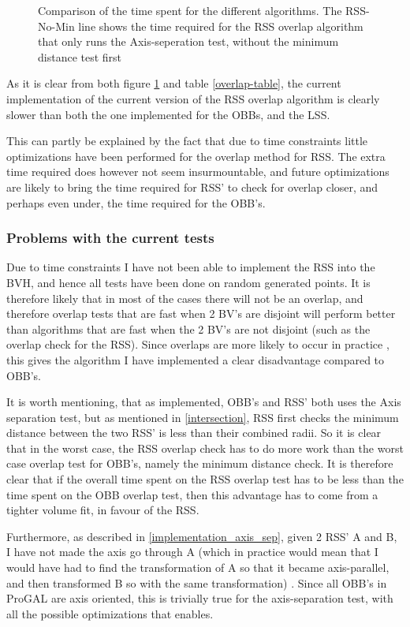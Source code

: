 \begin{figure}
\caption{\label{overlap-OBB_RSS_RSS-No-Min_LSS}Comparison of the time spent for the different algorithms. The RSS-No-Min line shows the time required for the RSS overlap algorithm that only runs the Axis-seperation test, without the minimum distance test first}
\end{figure}

As it is clear from both figure \ref{overlap-OBB_RSS_RSS-No-Min_LSS} and table \ref{overlap-table}, the current implementation of the current version of the RSS overlap algorithm is clearly slower than both the one implemented for the OBBs, and the LSS. 

This can partly be explained by the fact that due to time constraints little optimizations have been performed for the overlap method for RSS. The extra time required does however not seem insurmountable, and future optimizations are likely to bring the time required for RSS' to check for overlap closer, and perhaps even under, the time required for the OBB's.

\subsubsection{Problems with the current tests}
\label{test_problems}
Due to time constraints I have not been able to implement the RSS into the BVH, and hence all tests have been done on random generated points. It is therefore likely that in most of the cases there will not be an overlap, and therefore overlap tests that are fast when 2 BV's are disjoint will perform better than algorithms that are fast when the 2 BV's are not disjoint (such as the overlap check for the RSS). Since overlaps are more likely to occur in practice , this gives the algorithm I have implemented a clear disadvantage compared to OBB's.

It is worth mentioning, that as implemented, OBB's and RSS' both uses the Axis separation test, but as mentioned in \ref{intersection}, RSS first checks the minimum distance between the two RSS' is less than their combined radii. So it is clear that in the worst case, the RSS overlap check has to do more work than the worst case overlap test for OBB's, namely the minimum distance check. It is therefore clear that if the overall time spent on the RSS overlap test has to be less than the time spent on the OBB overlap test, then this advantage has to come from a tighter volume fit, in favour of the RSS. 

Furthermore, as described in \ref{implementation_axis_sep}, given 2 RSS' A and B, I have not made the axis go through A (which in practice would mean that I would have had to find the transformation of A so that it became axis-parallel, and then transformed B so with the same transformation) . Since all OBB's in ProGAL are axis oriented, this is trivially true for the axis-separation test, with all the possible optimizations that enables.
